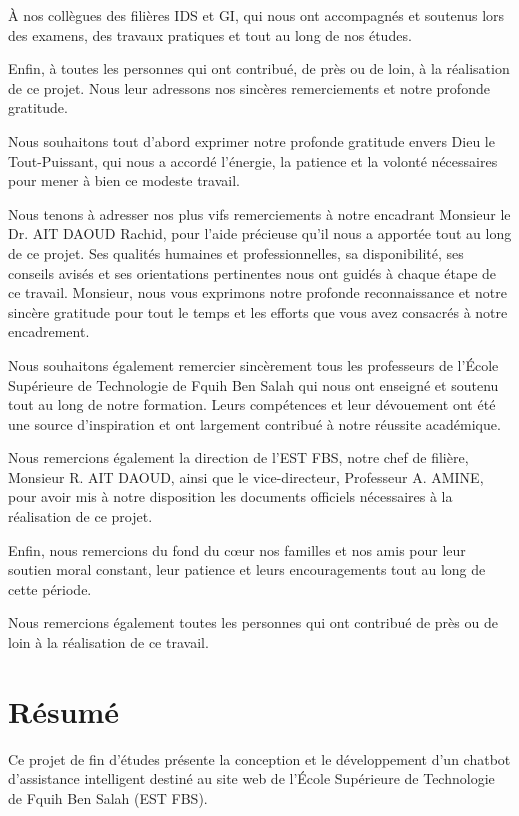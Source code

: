 \documentclass[12pt, a4paper, twoside]{report}
\begin{document}
À nos collègues des filières IDS et GI, qui nous ont accompagnés et soutenus lors des examens, des travaux pratiques et tout au long de nos études.

Enfin, à toutes les personnes qui ont contribué, de près ou de loin, à la réalisation de ce projet. Nous leur adressons nos sincères remerciements et notre profonde gratitude.

\newpage

Nous souhaitons tout d'abord exprimer notre profonde gratitude envers Dieu le Tout-Puissant, qui nous a accordé l'énergie, la patience et la volonté nécessaires pour mener à bien ce modeste travail.

Nous tenons à adresser nos plus vifs remerciements à notre encadrant Monsieur \newline le Dr. AIT DAOUD Rachid, pour l'aide précieuse qu'il nous a apportée tout au long de ce projet. Ses qualités humaines et professionnelles, sa disponibilité, ses conseils avisés et ses orientations pertinentes nous ont guidés à chaque étape de ce travail. Monsieur, nous vous exprimons notre profonde reconnaissance et notre sincère gratitude pour tout le temps et les efforts que vous avez consacrés à notre encadrement.

Nous souhaitons également remercier sincèrement tous les professeurs de l'École Supérieure de Technologie de Fquih Ben Salah qui nous ont enseigné et soutenu tout au long de notre formation. Leurs compétences et leur dévouement ont été une source d'inspiration et ont largement contribué à notre réussite académique.

Nous remercions également la direction de l’EST FBS, notre chef de filière, Monsieur R. AIT DAOUD, ainsi que le vice-directeur, Professeur A. AMINE, pour avoir mis à notre disposition les documents officiels nécessaires à la réalisation de ce projet.

Enfin, nous remercions du fond du cœur nos familles et nos amis pour leur soutien moral constant, leur patience et leurs encouragements tout au long de cette période.


Nous remercions également toutes les personnes qui ont contribué de près ou de loin à la réalisation de ce travail.

\chapter*{Résumé}

Ce projet de fin d'études présente la conception et le développement d'un chatbot d'assistance intelligent destiné au site web de l'École Supérieure de Technologie de Fquih Ben Salah (EST FBS). 
\end{document}
